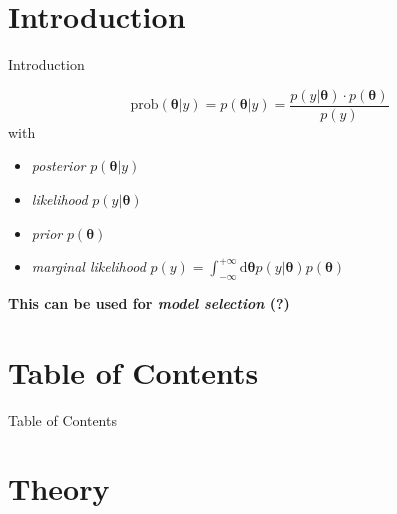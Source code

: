 \documentclass[11pt,aspectratio=1610,dvipsnames]{beamer}
\newcommand{\btheta}{\boldsymbol{\theta}}
\begin{document}

\section*{Introduction}
\begin{frame}{Introduction}
	\begin{tcolorbox}[colback=black!5,colframe=gray!15!black,title=\textsc{Bayes'} Theorem  -- a quick reminder] 
		$$\text{prob}(\btheta|y)=p(\btheta|y)= \frac{p(y|\boldsymbol{\theta})\cdot p(\boldsymbol{\theta})}{p(y)}$$
		with
		\begin{itemize}
			\item \emph{posterior} $p(\btheta|y)$\\
			\item \emph{likelihood} $p(y|\boldsymbol{\theta})$\\
			\item \emph{prior} $p(\boldsymbol{\theta})$\\
			\item \emph{marginal likelihood} $p(y)=\int_{-\infty}^{+\infty}\text{d}\boldsymbol{\theta} p(y|\boldsymbol{\theta})p(\boldsymbol{\theta})$\\
		\end{itemize}
	\begin{center}
		\textbf{This can be used for \emph{model selection} (?)}
	\end{center}
\end{tcolorbox}
\end{frame}


\section*{Table of Contents}

\begin{frame}{Table of Contents}
	\tableofcontents
\end{frame}

\section{Theory}
\end{document}

